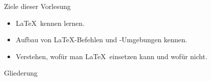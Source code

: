 
\begin{frame}{Ziele dieser Vorlesung}
  \begin{itemize}
    \item \LaTeX\ kennen lernen.
    \item Aufbau von \LaTeX-Befehlen und -Umgebungen kennen.
    \item Verstehen, wofür man \LaTeX\ einsetzen kann und wofür nicht.
  \end{itemize}
\end{frame}

\begin{frame}{Gliederung}
  \tableofcontents
\end{frame}
